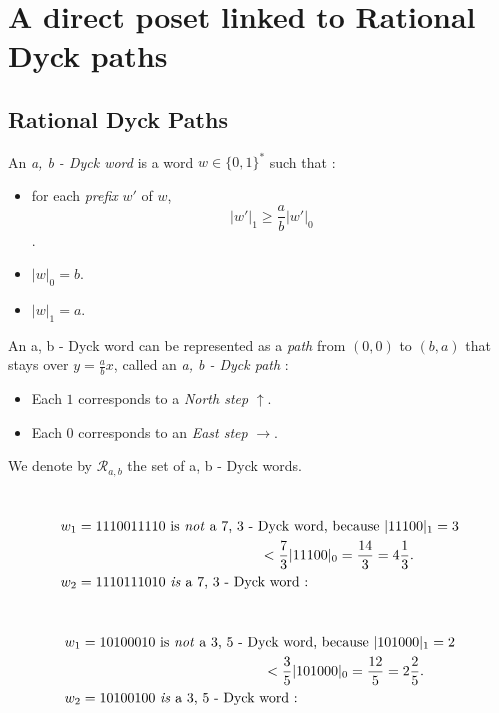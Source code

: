 \section{A direct poset linked to Rational Dyck paths}

\subsection{Rational Dyck Paths}

\begin{definition}
    An \emph{a, b - Dyck word} is a word $w \in \{0,1\}^*$
    such that :
    \begin{itemize}
        \item for each \emph{prefix} $w'$ of $w$,
            $$|w'|_1 \geqslant \frac{a}{b}|w'|_0$$.
        \item $|w|_0 = b$.
        \item $|w|_1 = a$.
    \end{itemize}
\end{definition}

An a, b - Dyck word can be represented as a 
\emph{path} from $(0,0)$ to $(b,a)$ that stays over
$y = \frac{a}{b}x$, called an \emph{a, b - Dyck path} :
\begin{itemize}
    \item Each $1$ corresponds to a \emph{North step}
    $\uparrow$. 
    \item Each $0$ corresponds to an \emph{East step}
    $\rightarrow$.
\end{itemize}
We denote by $\mathcal{R}_{a, b}$ the set of
a, b - Dyck words.

\begin{example}[$a > b : a = 7, b = 3$]
    ~\\
    \begin{align*}
        &w_1 = 1110011110 \text{ is \emph{not} a 7, 3 - Dyck
        word, because } |11100|_1 = 3\\
        & \hspace{5cm} < \frac{7}{3}|11100|_0
        = \frac{14}{3} = 4 \frac{1}{3}.\\
        &w_2 = 1110111010 \text{ \emph{is} a 7, 3 - Dyck 
        word : }\\
    \end{align*}
    
\end{example}

\begin{example}[$a < b : a = 3, b = 5$]
    ~\\
    \begin{align*}
        &w_1 = 10100010 \text{ is \emph{not} a 3, 5 - Dyck
        word, because } |101000|_1 = 2\\
        & \hspace{5cm} < \frac{3}{5}|101000|_0
        = \frac{12}{5} = 2 \frac{2}{5}.\\
        &w_2 = 10100100 \text{ \emph{is} a 3, 5 - Dyck 
        word : }\\
    \end{align*}
    
\end{example}

